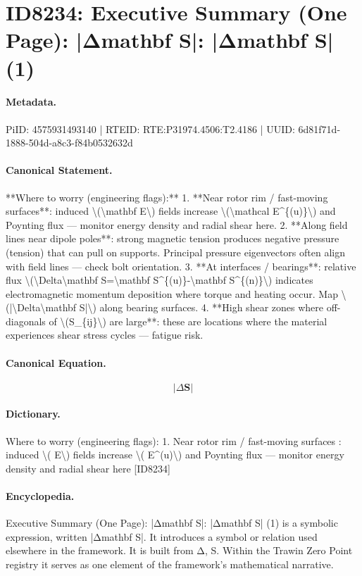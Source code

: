 \section*{ID8234: Executive Summary (One Page): |Δmathbf S|: |Δmathbf S| (1)}
\paragraph{Metadata.}
PiID: 4575931493140 | RTEID: RTE:P31974.4506:T2.4186 | UUID: 6d81f71d-1888-504d-a8c3-f84b0532632d

\paragraph{Canonical Statement.}
**Where to worry (engineering flags):** 1. **Near rotor rim / fast-moving surfaces**: induced \textbackslash{}(\textbackslash{}mathbf E\textbackslash{}) fields increase \textbackslash{}(\textbackslash{}mathcal E\textasciicircum{}\{(u)\}\textbackslash{}) and Poynting flux — monitor energy density and radial shear here. 2. **Along field lines near dipole poles**: strong magnetic tension produces negative pressure (tension) that can pull on supports. Principal pressure eigenvectors often align with field lines — check bolt orientation. 3. **At interfaces / bearings**: relative flux \textbackslash{}(\textbackslash{}Delta\textbackslash{}mathbf S=\textbackslash{}mathbf S\textasciicircum{}\{(u)\}-\textbackslash{}mathbf S\textasciicircum{}\{(n)\}\textbackslash{}) indicates electromagnetic momentum deposition where torque and heating occur. Map \textbackslash{}(|\textbackslash{}Delta\textbackslash{}mathbf S|\textbackslash{}) along bearing surfaces. 4. **High shear zones where off-diagonals of \textbackslash{}(S\_\{ij\}\textbackslash{}) are large**: these are locations where the material experiences shear stress cycles — fatigue risk.

\paragraph{Canonical Equation.}
\[
|\Delta\mathbf S|
\]

\paragraph{Dictionary.}
Where to worry (engineering flags): 1. Near rotor rim / fast-moving surfaces : induced \textbackslash{}( E\textbackslash{}) fields increase \textbackslash{}( E\textasciicircum{}(u)\textbackslash{}) and Poynting flux — monitor energy density and radial shear here [ID8234]

\paragraph{Encyclopedia.}
Executive Summary (One Page): |Δmathbf S|: |Δmathbf S| (1) is a symbolic expression, written |Δmathbf S|. It introduces a symbol or relation used elsewhere in the framework. It is built from Δ, S. Within the Trawin Zero Point registry it serves as one element of the framework's mathematical narrative.
